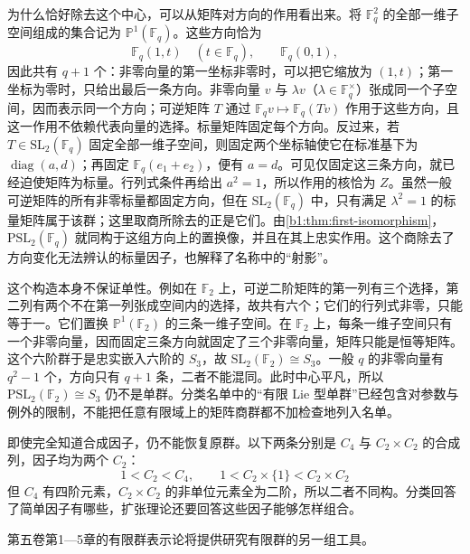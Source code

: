 \ProseParagraphBreak
为什么恰好除去这个中心，可以从矩阵对方向的作用看出来。将 \(\mathbb F_q^2\) 的全部一维子空间组成的集合记为 \(\mathbb P^1(\mathbb F_q)\)。这些方向恰为
\[
	\mathbb F_q(1,t)\quad(t\in\mathbb F_q),\qquad \mathbb F_q(0,1),
\]
因此共有 \(q+1\) 个：非零向量的第一坐标非零时，可以把它缩放为 \((1,t)\)；第一坐标为零时，只给出最后一条方向。非零向量 \(v\) 与 \(\lambda v\)（\(\lambda\in\mathbb F_q^\times\)）张成同一个子空间，因而表示同一个方向；可逆矩阵 \(T\) 通过 \(\mathbb F_q v\mapsto\mathbb F_q(Tv)\) 作用于这些方向，且这一作用不依赖代表向量的选择。标量矩阵固定每个方向。反过来，若 \(T\in\mathrm{SL}_2(\mathbb F_q)\) 固定全部一维子空间，则固定两个坐标轴使它在标准基下为 \(\operatorname{diag}(a,d)\)；再固定 \(\mathbb F_q(e_1+e_2)\)，便有 \(a=d\)。可见仅固定这三条方向，就已经迫使矩阵为标量。行列式条件再给出 \(a^2=1\)，所以作用的核恰为 \(Z\)。虽然一般可逆矩阵的所有非零标量都固定方向，但在 \(\mathrm{SL}_2(\mathbb F_q)\) 中，只有满足 \(\lambda^2=1\) 的标量矩阵属于该群；这里取商所除去的正是它们。由\cref{b1:thm:first-isomorphism}，\(\mathrm{PSL}_2(\mathbb F_q)\) 就同构于这组方向上的置换像，并且在其上忠实作用。这个商除去了方向变化无法辨认的标量因子，也解释了名称中的“射影”。

\ProseParagraphBreak
这个构造本身不保证单性。例如在 \(\mathbb F_2\) 上，可逆二阶矩阵的第一列有三个选择，第二列有两个不在第一列张成空间内的选择，故共有六个；它们的行列式非零，只能等于一。它们置换 \(\mathbb P^1(\mathbb F_2)\) 的三条一维子空间。在 \(\mathbb F_2\) 上，每条一维子空间只有一个非零向量，因而固定三条方向就固定了三个非零向量，矩阵只能是恒等矩阵。这个六阶群于是忠实嵌入六阶的 \(S_3\)，故 \(\mathrm{SL}_2(\mathbb F_2)\cong S_3\)。一般 \(q\) 的非零向量有 \(q^2-1\) 个，方向只有 \(q+1\) 条，二者不能混同。此时中心平凡，所以 \(\mathrm{PSL}_2(\mathbb F_2)\cong S_3\) 仍不是单群。分类名单中的“有限 Lie 型单群”已经包含对参数与例外的限制，不能把任意有限域上的矩阵商群都不加检查地列入名单。

\ProseParagraphBreak
\begin{samepage}
	即使完全知道合成因子，仍不能恢复原群。以下两条分别是 \(C_4\) 与 \(C_2\times C_2\) 的合成列，因子均为两个 \(C_2\)：
	\[
		1<C_2<C_4,\qquad 1<C_2\times\{1\}<C_2\times C_2
	\]
	但 \(C_4\) 有四阶元素，\(C_2\times C_2\) 的非单位元素全为二阶，所以二者不同构。分类回答了简单因子有哪些，扩张理论还要回答这些因子能够怎样组合。
\end{samepage}

\ProseParagraphBreak
第五卷第1—5章的有限群表示论将提供研究有限群的另一组工具。
